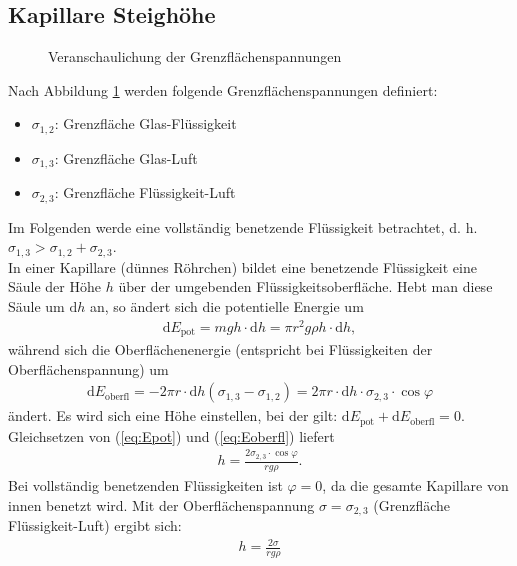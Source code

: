 \subsection{Kapillare Steighöhe}
%
\begin{figure}[H]
\centering
\resizebox{0.5\textwidth}{!}{}
\caption{Veranschaulichung der Grenzflächenspannungen}
\label{img:grenzflaechen}
\end{figure}
%
Nach Abbildung \ref{img:grenzflaechen} werden folgende Grenzflächenspannungen definiert:
%
\begin{itemize}
	\item $\sigma_{1,2}$: Grenzfläche Glas-Flüssigkeit
	\item $\sigma_{1,3}$: Grenzfläche Glas-Luft
	\item $\sigma_{2,3}$: Grenzfläche Flüssigkeit-Luft
\end{itemize}
%
Im Folgenden werde eine vollständig benetzende Flüssigkeit betrachtet, d. h. $\sigma_{1,3}>\sigma_{1,2}+\sigma_{2,3}$.\\
In einer Kapillare (dünnes Röhrchen) bildet eine benetzende Flüssigkeit eine Säule der Höhe $h$ über der umgebenden Flüssigkeitsoberfläche. Hebt man diese Säule um $\mathrm dh$ an, so ändert sich die potentielle Energie um
%
\begin{align}
	\mathrm dE_{\text{pot}} = mgh \cdot \mathrm dh = \pi r^2g\rho h \cdot \mathrm dh,
	\label{eq:Epot}
\end{align}
%
während sich die Oberflächenenergie (entspricht bei Flüssigkeiten der Oberflächenspannung) um
%
\begin{align}
	\mathrm dE_{\text{oberfl}} = -2\pi r \cdot \mathrm dh \left(\sigma_{1,3}-\sigma_{1,2}\right) = 2\pi r \cdot \mathrm dh \cdot \sigma_{2,3} \cdot \cos \varphi
	\label{eq:Eoberfl}
\end{align}
%
ändert. \cite{Demtroeder:2008:Book} Es wird sich eine Höhe einstellen, bei der gilt: $\mathrm dE_{\text{pot}} + \mathrm dE_{\text{oberfl}} = 0$. Gleichsetzen von (\ref{eq:Epot}) und (\ref{eq:Eoberfl}) liefert
%
\begin{align}
	h = \frac{2\sigma_{2,3} \cdot \cos \varphi}{rg\rho}.
\end{align}
%
Bei vollständig benetzenden Flüssigkeiten ist $\varphi = 0$, da die gesamte Kapillare von innen benetzt wird. Mit der Oberflächenspannung $\sigma = \sigma_{2,3}$ (Grenzfläche Flüssigkeit-Luft) ergibt sich:
%
\begin{align}
	h = \frac{2\sigma}{rg\rho}
	\label{eq:steighoehe}
\end{align}
%
